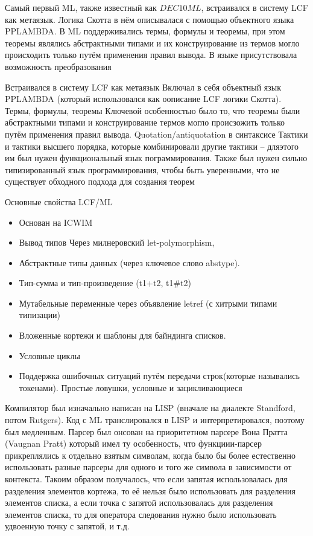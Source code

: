 \documentclass[14pt]{matmex-diploma-custom}
\begin{document}
Самый первый ML, также известный как $DEC10 ML$, встраивался в систему LCF как метаязык. Логика Скотта в нём описывалася с помощью объектного языка PPLAMBDA. В ML поддерживались термы, формулы и теоремы, при этом теоремы являлись абстрактными типами и их конструирование из термов могло происходить только путём применения правил вывода. В языке присутствовала возможность преобразования 
\begin{itemize}
Встраивался в систему LCF как метаязык
Включал в себя объектный язык PPLAMBDA (который использовался как оописание LCF логики Скотта). 
Термы, формулы, теоремы 
Ключевой особенностью было то, что теоремы были абстрактными типами и конструирование термов могло происзожить только путём применения правил вывода.
Quotation/antiquotation в синтаксисе
Тактики и тактики высшего порядка, которые комбинировали другие тактики -- дляэтого им был нужен функциональный язык пограммирования. Также был нужен сильно типизированный язык программирования, чтобы быть уверенными, что не существует обходного подхода для создания теорем
\begin{itemize}

Основные свойства LCF/ML
\begin{itemize}
  \item Основан на ICWIM
  \item Вывод типов Через милнеровский let-polymorphism,
  \item Абстрактные типы данных (через ключевое слово abstype).
  \item Тип-сумма и тип-произведение (t1+t2, t1\#t2)
  \item Мутабельные переменные через объявление letref (с хитрыми типами типизации)
  \item Вложенные кортежи и шаблоны для байндинга списков.
  \item Условные циклы
  \item Поддержка ошибочных ситуаций путём передачи строк(которые назывались токенами). Простые ловушки, условные и зацикливающиеся 
\end{itemize}


 Компилятор был изначально написан на LISP (вначале на диалекте Standford, потом Rutgers). Код с ML транслировался в LISP и интерпретировался, поэтому был медленным. Парсер был онсован на приоритетном парсере Вона Пратта (Vaugnan Pratt) который имел ту особенность, что функциии-парсер прикреплялись к отдельно взятым символам, когда было бы более естественно использовать разные парсеры для одного и того же символа в зависимости от контекста. Такоим образом получалось, что если запятая использовалась для разделения элементов кортежа, то её нельзя было использовать для разделения элементов списка, а если точка с запятой использовалась для разделения элементов списка, то для оператора следования нужно было использовать удвоенную точку с запятой, и т.д.


\end{itemize}
\end{itemize}
\end{document}
